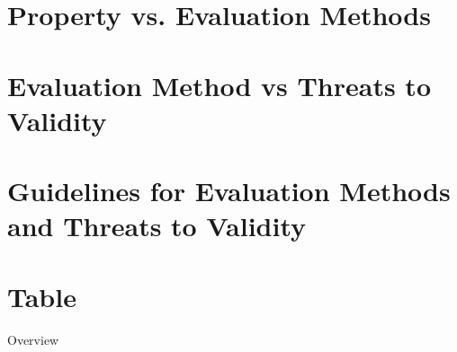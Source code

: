 \documentclass[a4paper, 11pt, twoside=semi]{scrartcl}
\begin{document}
\section{Property vs. Evaluation Methods}






\section{Evaluation Method vs Threats to Validity}







\section{Guidelines for Evaluation Methods and Threats to Validity}









\section{Table}

\begin{table}[p]

\caption{Overview}
\end{table}



\end{document}
